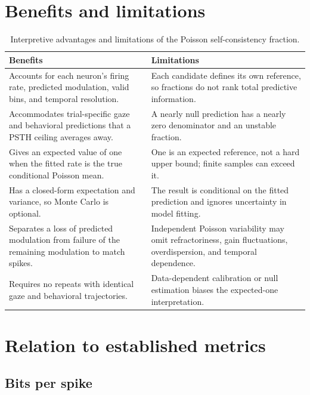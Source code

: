 \documentclass[11pt]{article}
\begin{document}
\section{Benefits and limitations}

\begin{table}[ht]
\centering
\small
\begin{tabular}{p{}p{}}
\toprule
Benefits & Limitations \\
\midrule
Accounts for each neuron's firing rate, predicted modulation, valid bins, and temporal resolution. & Each candidate defines its own reference, so fractions do not rank total predictive information. \\
\addlinespace
Accommodates trial-specific gaze and behavioral predictions that a PSTH ceiling averages away. & A nearly null prediction has a nearly zero denominator and an unstable fraction. \\
\addlinespace
Gives an expected value of one when the fitted rate is the true conditional Poisson mean. & One is an expected reference, not a hard upper bound; finite samples can exceed it. \\
\addlinespace
Has a closed-form expectation and variance, so Monte Carlo is optional. & The result is conditional on the fitted prediction and ignores uncertainty in model fitting. \\
\addlinespace
Separates a loss of predicted modulation from failure of the remaining modulation to match spikes. & Independent Poisson variability may omit refractoriness, gain fluctuations, overdispersion, and temporal dependence. \\
\addlinespace
Requires no repeats with identical gaze and behavioral trajectories. & Data-dependent calibration or null estimation biases the expected-one interpretation. \\
\bottomrule
\end{tabular}
\caption{Interpretive advantages and limitations of the Poisson self-consistency fraction.}
\label{tab:pros_cons}
\end{table}

\section{Relation to established metrics}

\subsection{Bits per spike}
\end{document}
